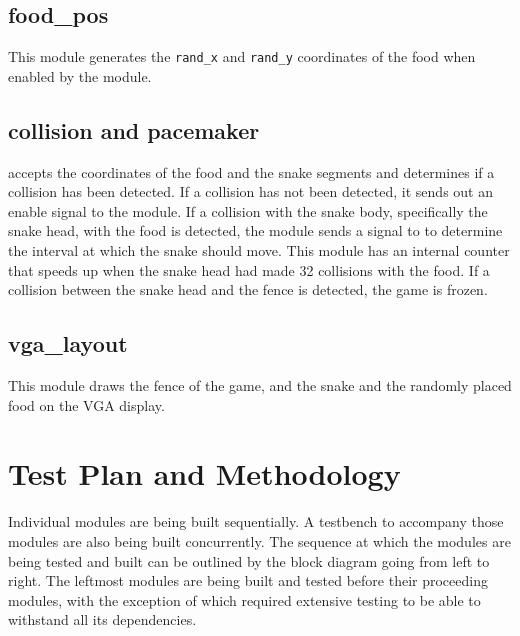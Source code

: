 \documentclass[paper=usletter, fontsize=12pt]{article}
\begin{document}
        \subsection{food\_pos}
        This module generates the \texttt{rand\_x} and \texttt{rand\_y} coordinates of the food when enabled by the  module.

        \subsection{collision and pacemaker}
         accepts the coordinates of the food and the snake segments and determines if a collision has been detected. If a collision has not been detected, it sends out an enable signal to the  module. If a collision with the snake body, specifically the snake head, with the food is detected, the module sends a signal to  to determine the interval at which the snake should move. This module has an internal counter that speeds up when the snake head had made 32 collisions with the food. If a collision between the snake head and the fence is detected, the game is frozen.

        \subsection{vga\_layout}
        This module draws the fence of the game, and the snake and the randomly placed food on the VGA display.

    \section{Test Plan and Methodology}
    Individual modules are being built sequentially. A testbench to accompany those modules are also being built concurrently. The sequence at which the modules are being tested and built can be outlined by the block diagram going from left to right. The leftmost modules are being built and tested before their proceeding modules, with the exception of  which required extensive testing to be able to withstand all its dependencies.

\end{document}
